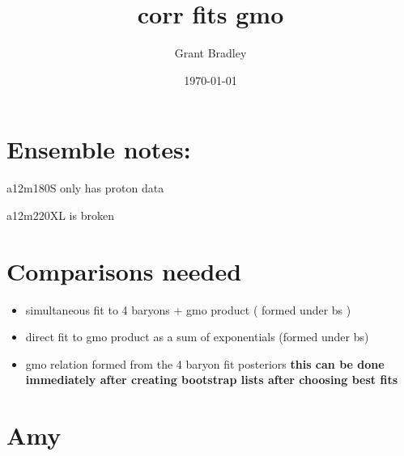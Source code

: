 \documentclass{article}
\title{corr fits gmo}
\author{Grant Bradley}
\date{\today}
\begin{document}
\section{Ensemble notes:} 

a12m180S only has proton data 

a12m220XL is broken 

\section{Comparisons needed}

\begin{itemize}
    \item simultaneous fit to 4 baryons + gmo product ( formed under bs )
    \item direct fit to  gmo product as a sum of exponentials (formed under bs)
    \item gmo relation formed from the 4 baryon fit posteriors 
        \subitem \textbf{this can be done immediately after creating bootstrap lists after choosing best fits}
\end{itemize}
\newpage
\section*{Amy}
\end{document}
